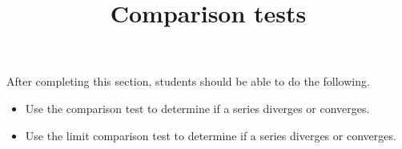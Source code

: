 \documentclass{ximera}
\title{Comparison tests}
\begin{document}
\begin{abstract}
\end{abstract}

\maketitle

\begin{sectionOutcomes}

After completing this section, students should be able to do the following.

\begin{itemize}
\item Use the comparison test to determine if a series diverges or
  converges.
\item Use the limit comparison test to determine if a series diverges
  or converges.
\end{itemize}

\end{sectionOutcomes}
\end{document}
